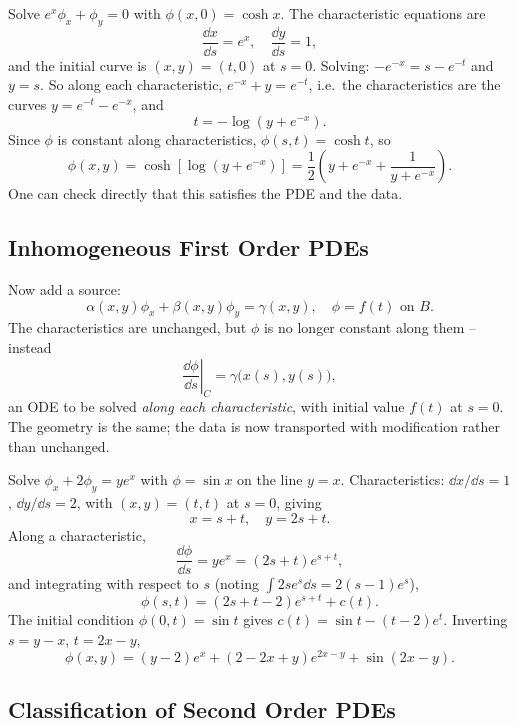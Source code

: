 \documentclass[a4paper]{scrartcl}
\begin{document}
\begin{example}
    Solve $e^x \phi_x + \phi_y = 0$ with $\phi(x, 0) = \cosh x$.
    The characteristic equations are
    $$
    \frac{\dd x}{\dd s} = e^x, \quad \frac{\dd y}{\dd s} = 1,
    $$
    and the initial curve is $(x, y) = (t, 0)$ at $s = 0$. Solving: $-e^{-x} = s - e^{-t}$ and $y = s$. So along each characteristic, $e^{-x} + y = e^{-t}$, i.e.\ the characteristics are the curves $y = e^{-t} - e^{-x}$, and
    $$
    t = -\log\left(y + e^{-x}\right).
    $$
    Since $\phi$ is constant along characteristics, $\phi(s, t) = \cosh t$, so
    $$
    \phi(x, y) = \cosh \left[\log\left(y + e^{-x}\right)\right] = \frac{1}{2}\left(y + e^{-x} + \frac{1}{y + e^{-x}}\right).
    $$
    One can check directly that this satisfies the PDE and the data.
\end{example}

\subsection{Inhomogeneous First Order PDEs}

Now add a source:
$$
\alpha(x, y) \phi_x + \beta(x, y) \phi_y = \gamma(x, y), \quad \phi = f(t) \text{ on } B.
$$
The characteristics are unchanged, but $\phi$ is no longer constant along them -- instead
$$
\left.\frac{\dd \phi}{\dd s}\right|_C = \gamma\big(x(s), y(s)\big),
$$
an ODE to be solved \emph{along each characteristic}, with initial value $f(t)$ at $s = 0$. The geometry is the same; the data is now transported with modification rather than unchanged.

\begin{example}
    Solve $\phi_x + 2 \phi_y = y e^x$ with $\phi = \sin x$ on the line $y = x$.
    Characteristics: $\dd x/\dd s = 1$, $\dd y /\dd s = 2$, with $(x, y) = (t, t)$ at $s = 0$, giving
    $$
    x = s + t, \quad y = 2s + t.
    $$
    Along a characteristic,
    $$
    \frac{\dd \phi}{\dd s} = y e^x = (2s + t)e^{s + t},
    $$
    and integrating with respect to $s$ (noting $\int 2s e^s \dd s = 2(s-1)e^s$),
    $$
    \phi(s, t) = (2s + t - 2)e^{s + t} + c(t).
    $$
    The initial condition $\phi(0, t) = \sin t$ gives $c(t) = \sin t - (t - 2)e^t$. Inverting $s = y - x$, $t = 2x - y$,
    $$
    \phi(x, y) = (y - 2) e^x + (2 - 2x + y)e^{2x - y} + \sin (2x - y).
    $$
\end{example}

\subsection{Classification of Second Order PDEs}
\end{document}
